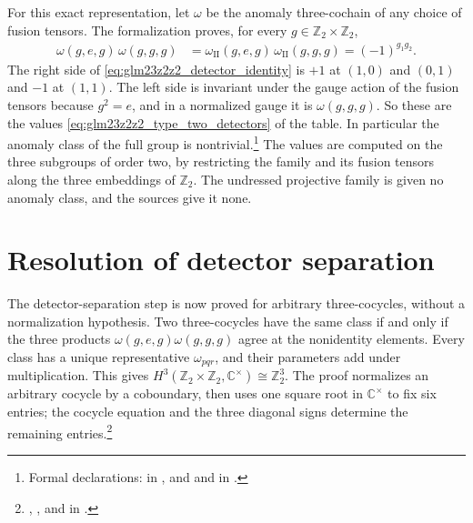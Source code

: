 \documentclass{article}
\begin{document}
For this exact representation, let $\omega$ be the anomaly three-cochain of
any choice of fusion tensors. The formalization proves, for every
$g\in\mathbb{Z}_2\times\mathbb{Z}_2$,
\begin{align}
    \omega(g,e,g)\,\omega(g,g,g)
     & =\omega_{\mathrm{II}}(g,e,g)\,\omega_{\mathrm{II}}(g,g,g)
    =(-1)^{g_1g_2}.
    \label{eq:glm23z2z2_detector_identity}
\end{align}
The right side of \eqref{eq:glm23z2z2_detector_identity} is $+1$ at $(1,0)$
and $(0,1)$ and $-1$ at $(1,1)$. The left side is invariant under the gauge
action of the fusion tensors because $g^2=e$, and in a normalized gauge it is
$\omega(g,g,g)$. So these are the values \eqref{eq:glm23z2z2_type_two_detectors}
of the table. In particular the anomaly class of
the full group is nontrivial.\footnote{Formal declarations:
     in
    ,
    and  and
     in
    .}
The values are computed on the three subgroups of order two, by restricting
the family and its fusion tensors along the three embeddings of
$\mathbb{Z}_2$. The undressed projective family is given no anomaly class,
and the sources give it none.

\section{Resolution of detector separation}

The detector-separation step is now proved for arbitrary three-cocycles,
without a normalization hypothesis. Two three-cocycles have the same class
if and only if the three products
$\omega(g,e,g)\omega(g,g,g)$ agree at the nonidentity elements.
Every class has a unique representative $\omega_{pqr}$, and their parameters
add under multiplication. This gives
$H^3(\mathbb{Z}_2\times\mathbb{Z}_2,\mathbb{C}^{\times})\cong\mathbb{Z}_2^3$.
The proof normalizes an arbitrary cocycle by a coboundary, then uses one
square root in $\mathbb{C}^{\times}$ to fix six entries; the cocycle equation
and the three diagonal signs determine the remaining entries.\footnote{
    ,
    ,
    and  in
    .}
\end{document}
